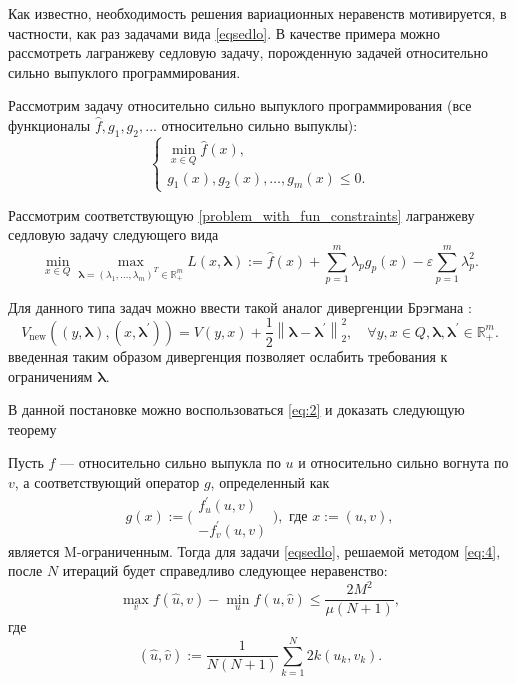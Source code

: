 Как известно, необходимость решения вариационных неравенств мотивируется, в частности, как раз задачами вида \eqref{eqsedlo}. В качестве примера можно рассмотреть лагранжеву седловую задачу, порожденную задачей относительно сильно выпуклого программирования.  
\begin{example} Рассмотрим задачу относительно сильно выпуклого программирования (все функционалы $\widehat{f}, g_1, g_2, ...$ относительно сильно выпуклы):
    \begin{equation}\label{problem_with_fun_constraints}
        \left\{\begin{array}{c}
        \min_{x \in Q} \widehat{f}(x), \\
        g_{1}(x), g_{2}(x), \ldots, g_{m}(x) \leq 0.
        \end{array}\right.
    \end{equation}
        
    Рассмотрим соответствующую \eqref{problem_with_fun_constraints} лагранжеву седловую задачу следующего вида
    \begin{equation}\label{lagrange_problem}
        \min_{x \in Q} \max_{ \boldsymbol{\lambda}= (\lambda_1, \ldots, \lambda_m)^T \in \mathbb{R}_+^m} L(x, \boldsymbol{\lambda}) :=  \widehat{f}(x) + \sum_{p=1}^{m} \lambda_p g_p(x) - \varepsilon \sum_{p=1}^m \lambda_{p}^2.
    \end{equation}
\end{example}
Для данного типа задач можно ввести такой аналог дивергенции Брэгмана \cite{Fedor_relative_adapuniv}:
$$
    V_{\text{new}}\left((y, \boldsymbol{\lambda}), (x, \boldsymbol{\lambda}^{'})\right) = V(y,x) + \frac{1}{2} \left\|\boldsymbol{\lambda} - \boldsymbol{\lambda}^{'}\right\|_2^2, \quad  \forall y, x \in Q, \boldsymbol{\lambda},  \boldsymbol{\lambda}^{'} \in \mathbb{R}_+^m.
$$
введенная таким образом дивергенция позволяет ослабить требования к ограничениям $\boldsymbol{\lambda}$.

В данной постановке можно воспользоваться \eqref{eq:2} и доказать следующую теорему
\begin{theorem}
    Пусть $f$ --- относительно сильно выпукла по $u$ и относительно сильно вогнута по $v$, а соответствующий оператор $g$, определенный как
    \[
        g(x) := \Bigg( 
            \begin{aligned}
                f^{'}_{u}(u,v)\\
                -f^{'}_{v}(u,v)
            \end{aligned}
        \Bigg), \text{ где } x := (u, v),
    \]
    является M-ограниченным. Тогда для задачи \eqref{eqsedlo}, решаемой методом \eqref{eq:4}, после $N$ итераций будет справедливо следующее неравенство:
    \begin{equation}
        \max_{v} f(\widehat{u}, v) - \min_{u} f(u, \widehat{v}) \leq \frac{2M^2}{\mu (N+1)},
    \end{equation}
    где
    \[
        (\widehat{u}, \widehat{v}) := \frac{1}{N(N+1)} \sum_{k=1}^{N} 2k (u_k,v_k).
    \]
\end{theorem}

